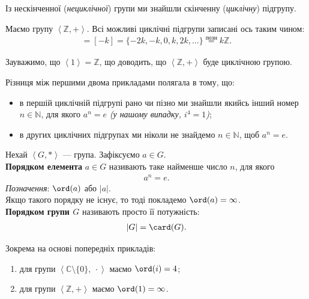 \documentclass{math_library}
\begin{document}
\begin{remark}
Із нескінченної (\textit{нециклічної}) групи ми знайшли скінченну (\textit{циклічну}) підгрупу.
\end{remark}

\begin{example}
Маємо групу $\left< \mathbb{Z}, + \right>$. Всі можливі циклічні підгрупи записані ось таким чином:
\begin{align*}
[k] = [-k] = \{-2k,-k,0,k,2k,\dots\} \overset{\text{позн}}{=} k\mathbb{Z}.
\end{align*}
\end{example}

\begin{example}
Зауважимо, що $\left<1\right> = \mathbb{Z}$, що доводить, що $\left< \mathbb{Z}, + \right>$ буде циклічною групою.
\end{example}

\begin{remark}
Різниця між першими двома прикладами полягала в тому, що:
\begin{itemize}[nosep]
\item в першій циклічній підгрупі рано чи пізно ми знайшли якийсь інший номер $n \in \mathbb{N}$, для якого $a^n = e$ \textit{(у нашому випадку, $i^4 = 1$)};
\item в других циклічних підгрупах ми ніколи не знайдемо $n \in \mathbb{N}$, щоб $a^n = e$.
\end{itemize}
\end{remark}

\begin{definition}
Нехай $\left<G,* \right>$ --- група. Зафіксуємо $a \in G$.\\
\textbf{Порядком елемента} $a \in G$ називають таке найменше число $n$, для якого
\begin{align*}
a^n = e.
\end{align*}
\textit{Позначення}: $\ord (a)$ або $|a|$. \\
Якщо такого порядку не існує, то тоді покладемо $\ord (a) = \infty$.\\
\textbf{Порядком групи $G$} називають просто її потужність:
\begin{align*}
|G| = \card(G).
\end{align*}
\end{definition}

\begin{example}
Зокрема на основі попередніх прикладів:
\begin{enumerate}[nosep,wide=0pt,label={\arabic*)}]
\item для групи $\left< \mathbb{C} \setminus \{0\},\ \cdot \right>$ маємо $\ord(i) = 4$;
\item для групи $\left< \mathbb{Z},+\right>$ маємо $\ord(1) = \infty$.
\end{enumerate}
\end{example}
\end{document}
